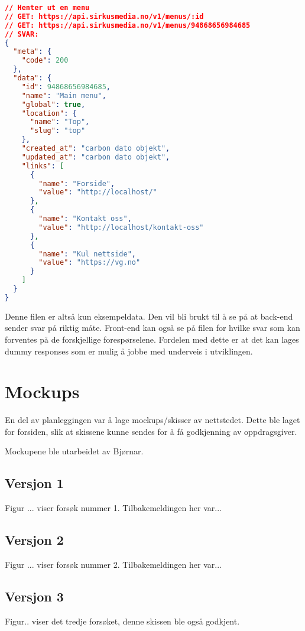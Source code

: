\begin{lstlisting}[language=json]
// Henter ut en menu
// GET: https://api.sirkusmedia.no/v1/menus/:id
// GET: https://api.sirkusmedia.no/v1/menus/94868656984685
// SVAR:
{
  "meta": {
    "code": 200
  },
  "data": {
    "id": 94868656984685,
    "name": "Main menu",
    "global": true,
    "location": {
      "name": "Top",
      "slug": "top"
    },
    "created_at": "carbon dato objekt",
    "updated_at": "carbon dato objekt",
    "links": [
      {
        "name": "Forside",
        "value": "http://localhost/"
      },
      {
        "name": "Kontakt oss",
        "value": "http://localhost/kontakt-oss"
      },
      {
        "name": "Kul nettside",
        "value": "https://vg.no"
      }
    ]
  }
}
\end{lstlisting}

Denne filen er altså kun eksempeldata. Den vil bli brukt til å se på at back-end sender svar på riktig måte. Front-end kan også se på filen for hvilke svar som kan forventes på de forskjellige forespørselene. Fordelen med dette er at det kan lages dummy responses som er mulig å jobbe med underveis i utviklingen.


\section{Mockups}
En del av planleggingen var å lage mockups/skisser av nettstedet. Dette ble laget for forsiden, slik at skissene kunne sendes for å få godkjenning av oppdragsgiver.

Mockupene ble utarbeidet av Bjørnar. 

\subsection{Versjon 1}
Figur ... viser forsøk nummer 1. Tilbakemeldingen her var...
\subsection{Versjon 2}
Figur ... viser forsøk nummer 2. Tilbakemeldingen her var...
\subsection{Versjon 3}
Figur.. viser det tredje forsøket, denne skissen ble også godkjent. 



